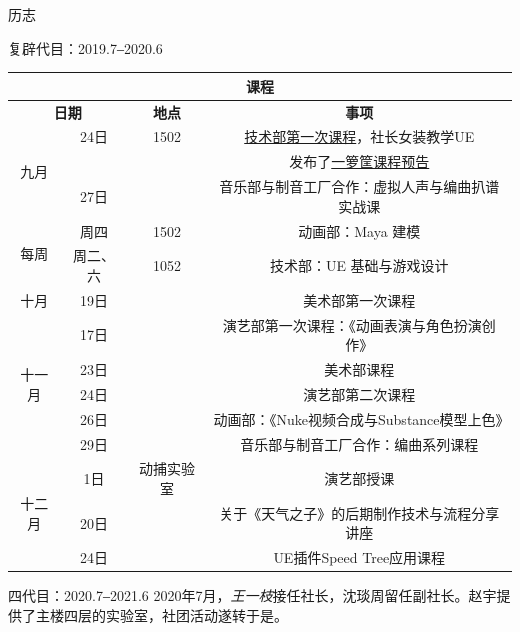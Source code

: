 \documentclass{paper}
\newcommand{\name}[1]{{\em #1}}
\renewcommand{\thead}[1]{\textbf{ #1}}
\begin{document}
\begin{section}{历志}
\begin{subsection}{复辟代目：2019.7‒2020.6}
		\begin{table}[H]\begin{center}
			\begin{tabular}{|c|c|c|c|}
				\hline
				\multicolumn{4}{|c|}{\thead{课程}} \\ \hline
				\multicolumn{2}{|c|}{\thead{日期}} & \thead{地点} & \thead{事项} \\ \hline
				\multirow{3}{*}{九月}
				& 24日 & 1502 & \href{https://mp.weixin.qq.com/s/Z-UWydG437TscaJQ_BRM0w}{技术部第一次课程}，社长女装教学UE \\
				& & & 发布了\href{https://mp.weixin.qq.com/s/vxlUYgRQCxnRmkGPHX58Yg}{一箩筐课程预告} \\
				& 27日 & & 音乐部与制音工厂合作：虚拟人声与编曲扒谱实战课 \\ \hline
				\multirow{2}{*}{每周}
				& 周四 & 1502 & 动画部：Maya 建模 \\
				& 周二、六 & 1052 & 技术部：UE 基础与游戏设计 \\ \hline
				\multirow{1}{*}{十月}
				& 19日 & & 美术部第一次课程 \\ \hline
				\multirow{5}{*}{十一月}
				& 17日 & & 演艺部第一次课程：《动画表演与角色扮演创作》 \\
				& 23日 & & 美术部课程 \\
				& 24日 & & 演艺部第二次课程 \\
				& 26日 & & 动画部：《Nuke视频合成与Substance模型上色》 \\
				& 29日 & & 音乐部与制音工厂合作：编曲系列课程 \\ \hline
				\multirow{3}{*}{十二月}
				& 1日 & 动捕实验室 & 演艺部授课 \\
				& 20日 & & 关于《天气之子》的后期制作技术与流程分享讲座 \\
				& 24日 & & UE插件Speed Tree应用课程 \\ \hline
			\end{tabular}
		\end{center}\end{table}
	\end{subsection}
	\begin{subsection}{四代目：2020.7‒2021.6}
		2020年7月，\name{王一枝}接任社长，沈琰周留任副社长。赵宇提供了主楼四层的实验室，社团活动遂转于是。


\end{subsection}
\end{section}
\end{document}
